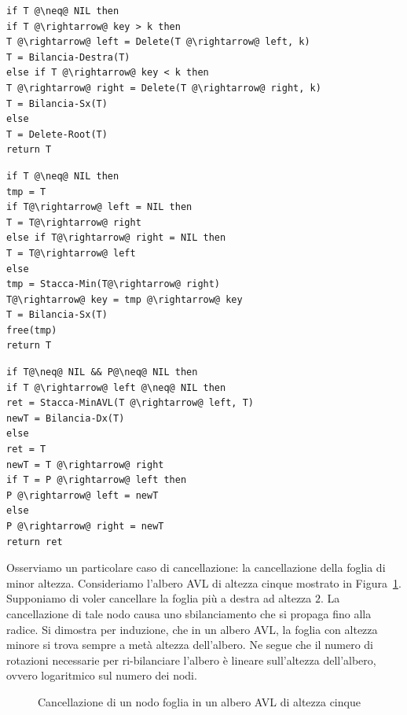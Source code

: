 \begin{center}
\begin{minipage}{.45\textwidth}
\begin{lstlisting}[language=asd,caption={\textsc{Delete}(T,k)},label=lst:delete-avl]
if T @\neq@ NIL then
if T @\rightarrow@ key > k then
T @\rightarrow@ left = Delete(T @\rightarrow@ left, k)
T = Bilancia-Destra(T)
else if T @\rightarrow@ key < k then
T @\rightarrow@ right = Delete(T @\rightarrow@ right, k)
T = Bilancia-Sx(T)
else
T = Delete-Root(T)
return T
\end{lstlisting}
\end{minipage}
\hfil
\begin{minipage}{.45\textwidth}
\begin{lstlisting}[language=asd,caption={\textsc{Delete-Root}(T)},label=lst:delete-root-avl]
if T @\neq@ NIL then
tmp = T
if T@\rightarrow@ left = NIL then
T = T@\rightarrow@ right
else if T@\rightarrow@ right = NIL then
T = T@\rightarrow@ left
else
tmp = Stacca-Min(T@\rightarrow@ right)
T@\rightarrow@ key = tmp @\rightarrow@ key
T = Bilancia-Sx(T)
free(tmp)
return T
\end{lstlisting}
\end{minipage}
\end{center}

\begin{lstlisting}[language=asd,caption={Stacca-MinAVL(T,P)},label=lst:stacca-min-avl]
if T@\neq@ NIL && P@\neq@ NIL then
if T @\rightarrow@ left @\neq@ NIL then
ret = Stacca-MinAVL(T @\rightarrow@ left, T)
newT = Bilancia-Dx(T)
else
ret = T
newT = T @\rightarrow@ right
if T = P @\rightarrow@ left then
P @\rightarrow@ left = newT
else
P @\rightarrow@ right = newT
return ret
\end{lstlisting}

Osserviamo un particolare caso di cancellazione: la cancellazione della foglia di minor altezza. Consideriamo l'albero AVL di altezza cinque mostrato in Figura~\ref{fig:delete-avl-leaf}. Supponiamo di voler cancellare la foglia più a destra ad altezza $2$. La cancellazione di tale nodo causa uno sbilanciamento che si propaga fino alla radice. Si dimostra per induzione, che in un albero AVL, la foglia con altezza minore si trova sempre a metà altezza dell'albero. Ne segue che il numero di rotazioni necessarie per ri-bilanciare l'albero è lineare sull'altezza dell'albero, ovvero logaritmico sul numero dei nodi.

\begin{figure}[ht!]
\centering
{}
\caption{Cancellazione di un nodo foglia in un albero AVL di altezza cinque}\label{fig:delete-avl-leaf}
\end{figure}


